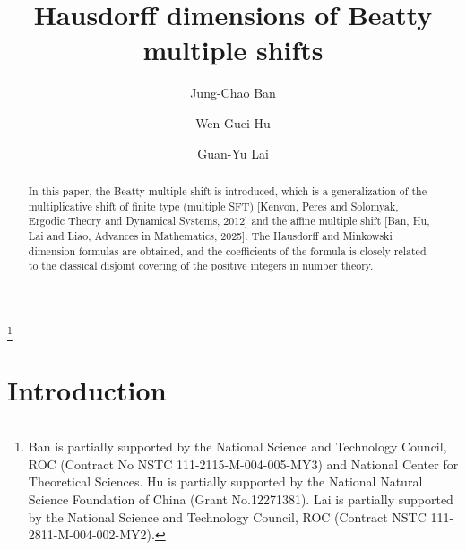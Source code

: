 \documentclass{amsart}
\theoremstyle{definition}
\numberwithin{equation}{section}%
\begin{document}
	\title{Hausdorff dimensions of Beatty multiple shifts}
   \author[Jung-Chao Ban]{Jung-Chao Ban}
	\address[Jung-Chao Ban]{Department of Mathematical Sciences, National Chengchi University, Taipei 11605, Taiwan, ROC.}
	\address{Math. Division, National Center for Theoretical Science, National Taiwan University, Taipei 10617, Taiwan. ROC.}
	
	\author[Wen-Guei Hu]{Wen-Guei Hu}
	\address[Wen-Guei Hu]{College of Mathematics, Sichuan University, Chengdu, 610064, P. R. China}
	
	\author[Guan-Yu Lai]{Guan-Yu Lai}
	\address[Guan-Yu Lai]{Department of Mathematical Sciences, National Chengchi University, Taipei 11605, Taiwan, ROC.}
	
	
	
	
	\thanks{Ban is partially supported by the National Science and Technology Council, ROC (Contract No NSTC 111-2115-M-004-005-MY3) and National Center for Theoretical Sciences. Hu is partially supported by the National Natural Science Foundation of China (Grant No.12271381). Lai is partially supported by the National Science and Technology Council, ROC (Contract NSTC 111-2811-M-004-002-MY2).}
	
	
	
	\begin{abstract}
		   In this paper, the Beatty multiple shift is introduced, which is a generalization of the multiplicative shift of finite type (multiple SFT) [Kenyon, Peres and Solomyak, Ergodic Theory and Dynamical Systems, 2012] and the affine multiple shift [Ban, Hu, Lai and Liao, Advances in Mathematics, 2025]. The Hausdorff and Minkowski dimension formulas are obtained, and the coefficients of the formula is closely related to the classical disjoint covering of the positive integers in number theory. 
	\end{abstract}
	\maketitle
\section{Introduction}\label{sec 1}
\end{document}
